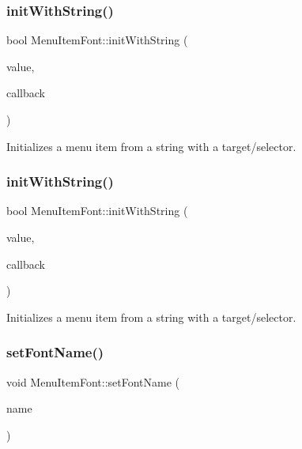 \subsubsection{\texorpdfstring{init\+With\+String()}{initWithString()}\hspace{0.1cm}{\footnotesize\ttfamily [3/4]}}
{\footnotesize\ttfamily bool Menu\+Item\+Font\+::init\+With\+String (\begin{DoxyParamCaption}\item[{const std\+::string \&}]{value,  }\item[{const cc\+Menu\+Callback \&}]{callback }\end{DoxyParamCaption})}

Initializes a menu item from a string with a target/selector. \mbox{\label{classMenuItemFont_adcc053518d3c01691ed13798055188e8}} 
\subsubsection{\texorpdfstring{init\+With\+String()}{initWithString()}\hspace{0.1cm}{\footnotesize\ttfamily [4/4]}}
{\footnotesize\ttfamily bool Menu\+Item\+Font\+::init\+With\+String (\begin{DoxyParamCaption}\item[{const std\+::string \&}]{value,  }\item[{const cc\+Menu\+Callback \&}]{callback }\end{DoxyParamCaption})}

Initializes a menu item from a string with a target/selector. \mbox{\label{classMenuItemFont_a7c23ecf46a3a1b7d22d97065c801e637}} 
\subsubsection{\texorpdfstring{set\+Font\+Name()}{setFontName()}\hspace{0.1cm}{\footnotesize\ttfamily [1/2]}}
{\footnotesize\ttfamily void Menu\+Item\+Font\+::set\+Font\+Name (\begin{DoxyParamCaption}\item[{const std\+::string \&}]{name }\end{DoxyParamCaption})\hspace{0.3cm}{\ttfamily [static]}}

